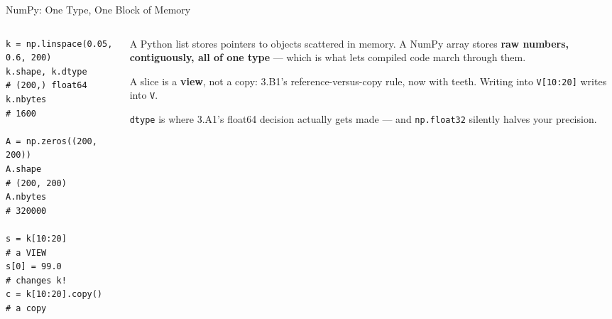 \begin{frame}[fragile]{NumPy: One Type, One Block of Memory}
\begin{columns}[T]
\begin{column}{0.50\textwidth}
\begin{lstlisting}
k = np.linspace(0.05, 0.6, 200)
k.shape, k.dtype     # (200,) float64
k.nbytes             # 1600

A = np.zeros((200, 200))
A.shape              # (200, 200)
A.nbytes             # 320000

s = k[10:20]         # a VIEW
s[0] = 99.0          # changes k!
c = k[10:20].copy()  # a copy
\end{lstlisting}
\end{column}
\begin{column}{0.47\textwidth}
\small
A Python list stores pointers to objects scattered in memory. A NumPy array stores \textbf{raw numbers, contiguously, all of one type} --- which is what lets compiled code march through them.
\medskip
\begin{cautionbox}\footnotesize
A slice is a \textbf{view}, not a copy: 3.B1's reference-versus-copy rule, now with teeth. Writing into \texttt{V[10:20]} writes into \texttt{V}.
\end{cautionbox}
\medskip
\begin{examplebox}\footnotesize
\texttt{dtype} is where 3.A1's float64 decision actually gets made --- and \texttt{np.float32} silently halves your precision.
\end{examplebox}
\end{column}
\end{columns}
\end{frame}

